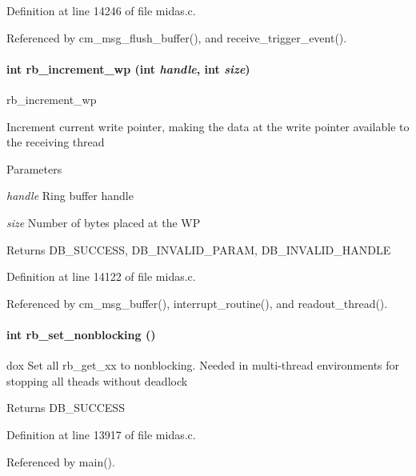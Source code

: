 Definition at line 14246 of file midas.c.

Referenced by cm\_\-msg\_\-flush\_\-buffer(), and receive\_\-trigger\_\-event().
\paragraph[{rb\_\-increment\_\-wp}]{\setlength{\rightskip}{0pt plus 5cm}int rb\_\-increment\_\-wp (int {\em handle}, \/  int {\em size})}\hfill\label{group__rbfunctionc_gad79588efc047402f5264e3ae9dc3bacc}
rb\_\-increment\_\-wp

Increment current write pointer, making the data at the write pointer available to the receiving thread 
\begin{DoxyParams}{Parameters}
\item[{\em handle}]Ring buffer handle \item[{\em size}]Number of bytes placed at the WP \end{DoxyParams}
\begin{DoxyReturn}{Returns}
DB\_\-SUCCESS, DB\_\-INVALID\_\-PARAM, DB\_\-INVALID\_\-HANDLE 
\end{DoxyReturn}


Definition at line 14122 of file midas.c.

Referenced by cm\_\-msg\_\-buffer(), interrupt\_\-routine(), and readout\_\-thread().
\paragraph[{rb\_\-set\_\-nonblocking}]{\setlength{\rightskip}{0pt plus 5cm}int rb\_\-set\_\-nonblocking ()}\hfill\label{group__rbfunctionc_gaabc49ab7300eae65b5cbdbaa00921a5d}
dox Set all rb\_\-get\_\-xx to nonblocking. Needed in multi-\/thread environments for stopping all theads without deadlock \begin{DoxyReturn}{Returns}
DB\_\-SUCCESS 
\end{DoxyReturn}


Definition at line 13917 of file midas.c.

Referenced by main().